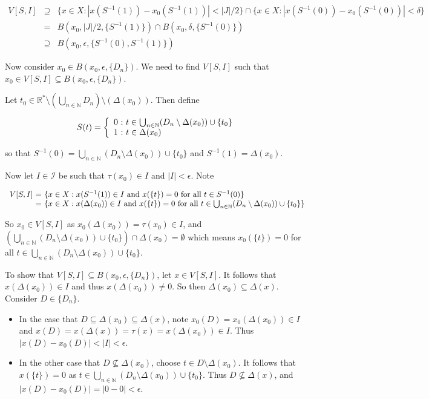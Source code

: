 \documentclass[12pt]{article}
\theoremstyle{plain}
\theoremstyle{definition}
\theoremstyle{remark}
\begin{document}
\[
\begin{array}{rcl}
V[S,I]
& \supseteq &
\{x\in X : |x(S^{-1}(1))-x_0(S^{-1}(1))|< |J|/2 \}
\cap
\{x\in X : |x(S^{-1}(0))-x_0(S^{-1}(0))|< \delta \}
\\ & = &
B(x_0,|J|/2,\{S^{-1}(1)\})
\cap
B(x_0,\delta,\{S^{-1}(0)\})
\\ & \supseteq &
B(x_0,\epsilon,\{S^{-1}(0),S^{-1}(1)\})
\end{array}
\]

Now consider $x_0 \in B(x_0,\epsilon,\{D_n\})$. We need to find $V[S,I]$ such that $x_0 \in V[S,I] \subseteq B(x_0,\epsilon,\{D_n\})$.

Let $t_0 \in \mathbb{R}^* \setminus \left(\bigcup_{n \in \mathbb{N}} D_n \right) \setminus \left(\Delta(x_0)\right)$.  Then define

\[
S(t) = \left\{
\begin{array}{r@{\ :\ }l}
0
&
t \in \bigcup_{n\in \mathbb{N}}(D_n\setminus \Delta(x_0)) \cup \{t_0\}
\\
1
&
t \in \Delta(x_0)
\end{array}
\right.
\]

so that $S^{-1}(0) = \bigcup_{n\in \mathbb{N}}(D_n\setminus \Delta(x_0)) \cup \{t_0\}$ and $S^{-1}(1)=\Delta(x_0)$.

Now let $I \in \mathcal{I}$ be such that $\tau(x_0) \in I$ and $|I|<\epsilon$. Note

\[
\begin{array}{r@{\ =\ }l}
V[S,I]
&
\{x\in X : x(S^{-1}(1))\in I
\text{ and }
x(\{t\}) = 0 \text{ for all } t \in S^{-1}(0) \}
\\ &
\{x\in X : x(\Delta(x_0))\in I
\text{ and }
x(\{t\}) = 0 \text{ for all } t \in \bigcup_{n\in \mathbb{N}}(D_n\setminus \Delta(x_0)) \cup \{t_0\} \}
\end{array}
\]

So $x_0 \in V[S,I]$ as $x_0(\Delta(x_0)) = \tau(x_0) \in I$, and $\left(\bigcup_{n\in \mathbb{N}}(D_n\setminus \Delta(x_0)) \cup \{t_0\}\right) \cap \Delta(x_0) = \emptyset$ which means $x_0(\{t\}) = 0$ for all $t \in \bigcup_{n\in \mathbb{N}}(D_n\setminus \Delta(x_0)) \cup \{t_0\}$.

To show that $V[S,I] \subseteq B(x_0,\epsilon,\{D_n\})$, let $x\in V[S,I]$.  It follows that $x(\Delta(x_0)) \in I$ and thus $x(\Delta(x_0)) \not= 0$. So then $\Delta(x_0)\subseteq \Delta(x)$.  Consider $D \in \{D_n\}$.

	\begin{itemize}
	\item
In the case that $D \subseteq \Delta(x_0) \subseteq \Delta(x)$, note $x_0(D) = x_0(\Delta(x_0))\in I$ and $x(D) = x(\Delta(x))=\tau(x)=x(\Delta(x_0)) \in I$.  Thus $|x(D)-x_0(D)| < |I| < \epsilon$.

	\item
In the other case that $D \not\subseteq \Delta(x_0)$, choose $t\in D \setminus \Delta(x_0)$. It follows that $x(\{t\})=0$ as $t \in \bigcup_{n\in \mathbb{N}}(D_n \setminus \Delta(x_0)) \cup \{t_0\}$. Thus $D \not\subseteq \Delta(x)$, and $|x(D)-x_0(D)| = |0-0| < \epsilon$.
	\end{itemize}
\end{document}
